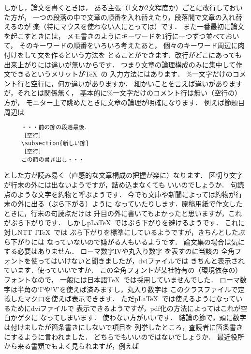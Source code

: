 \documentclass[onecolumn]{jsce}  %
\begin{document}
\begin{Enumerate}
しかし，論文を書くときは，
ある主張（1文か2文程度か）ごとに改行しておいた方が，
一つの段落の中で文章の順番を入れ替えたり，段落間で文章の入れ替えるのが
楽（特にマウスを使わない人にとっては）です．
また一番最初に論文を起こすときには，
メモ書きのようにキーワードを1行に一つずつ並べておいて，
そのキーワードの順番をいろいろ考えたあと，
個々のキーワード周辺に肉付けをして文を作るという方法を
とることができます．改行がどこにあっても出来上がりには違いが無いからです．
つまり文章の論理構成のみに集中して作文できるというメリットが\TeX\ の
入力方法にはあります．
%
\Qitem \%一文字だけのコメント行と空行に，何か違いがありますか．
\Aitem 細かいことを言えば違いがありますが，それとは関係無く，
基本的に\%一文字だけのコメント行は無い（空行の）方が，
モニター上で眺めたときに文章の論理が明確になります．
例えば節題目周辺は

\renewcommand{\baselinestretch}{.74}
\begin{verbatim}
     ・・・前の節の段落最後．
     ［空行］
     \subsection{新しい節}
     ［空行］
     この節の書き出し・・・
\end{verbatim}
\renewcommand{\baselinestretch}{1}
とした方が読み易く（直感的な文章構成の把握が楽に）なります．
%
\Qitem 区切り文字が行末の外には出ないようですが，詰め込まなくても
いいのでしょうか．
\Aitem 句読点のような文字を約物と呼ぶようです．
今でも文庫や新聞によっては約物が行末の外に出る（ぶら下がる）ように
なっていたりします．原稿用紙で作文したときに，行末の句読点だけは
升目の外に書いてもよかったと思いますが，これがぶら下がりです．
しかしp\LaTeX\ ではぶら下がりを避けるようです．
これに対しNTT J\TeX\ では
ぶら下がりを標準にしているようですが，きちんとしたぶら下がりには
なっていないので嫌がる人もいるようです．
論文集の場合は気にする必要はありません．
%
\Qitem ローマ数字IVや丸入り数字\,\,を表すのに当該の
全角フォントを使ってはいけないと聞きましたが，dviファイルでは
きちんと表示されています．使っていいですか．
\Aitem この全角フォントが某社特有の（環境依存の）フォントなので，
一般には日本語\TeX\ では採用していませんでした．
ローマ数字は半角の`I'や`V'を使えば済みますし，丸入り数字は
このクラスファイルで定義したマクロを使えば表示できます．
ただp\LaTeX\ では使えるようになっているためにdviファイルで
表示できるようですが，pdf化の方法によってはこれが空白かゲタに
なってしまいます．
使わない方がいいです．
%
\Qitem 結論の節で，頭に数字は付けましたが箇条書きにしないで項目を
列挙したところ，査読者に箇条書きにするように言われました．
どちらでもいいのではないでしょうか．
\Aitem 最近役所から来る書類でもよく見られますが，例えば


\end{Enumerate}
\end{document}
